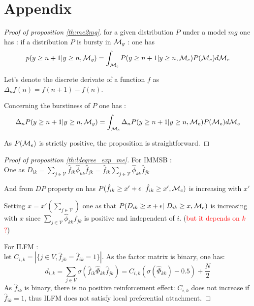 \section{Appendix}

\begin{proof}[Proof of proposition \ref{th:me2mg}]
for a given distribution $P$ under a model $mg$ one has : 
if a distribution $P$ is bursty in $\mathcal{M}_g$ : one has
\begin{equation*}
    p(y \geq n+1 | y \geq n, \mathcal{M}_g) = \int_{\mathcal{M}_e} P(y \geq n+1 | y \geq n, \mathcal{M}_e) P(\mathcal{M}_e) d\mathcal{M}_e
\end{equation*}

Let's denote the discrete derivate of a function $f$  as $\Delta_n f(n) = f(n+1) -f(n)$.

Concerning the burstiness of $P$ one has : 
\begin{equation}
    \Delta_n P(y \geq n+1 | y \geq n, \mathcal{M}_g) = \int_{\mathcal{M}_e}\Delta_n P(y \geq n+1 | y \geq n, \mathcal{M}_e) P(\mathcal{M}_e)d\mathcal{M}_e
\end{equation}

As $P(\mathcal{M}_e)$ is strictly positive, the proposition is straightforward.
\end{proof}



\begin{proof}[Proof of proposition \ref{th:ldegree_exp_me}]
For IMMSB : ~\\

One as 
$D_{ik} = \sum_{j\in\mathcal{V}} \hat f_{ik} \hat \phi_{kk} \hat f_{jk} = \hat f_{ik} \sum_{j\in\mathcal{V}} \hat \phi_{kk} \hat f_{jk}$

And from $DP$ property on has
$P(\hat f_{ik} \geq x' + \epsilon | \hat f_{ik} \geq x', \me)$ is increasing with $x'$

Setting $x = x' (\sum_{j\in\mathcal{V}})$ one as that $P(D_{ik} \geq x + \epsilon | D_{ik}
    \geq x, \me)$ is increasing with $x$ since $\sum_{j\in \mathcal{V}} \hat \phi_{kk}
    \hat f_{jk}$ is positive and independent of $i$. (\textcolor{red}{but it depends on
    $k$ ?})


For ILFM :~\\

 let $C_{i,k} = |\{j \in V, \hat{f}_{jk} = \hat{f}_{ik} = 1\}|$. As the factor matrix is
    binary, one has:
%
\[ 
d_{i,k} = \sum_{j\in V} \sigma(\hat{f}_{ik} \hat{\Phi}_{kk} \hat{f}_{jk}) =  C_{i,k} (\sigma(\hat{\Phi}_{kk})-0.5) + \frac{N}{2}
\]
%
As $\hat{f}_{ik}$ is binary, there is no positive reinforcement effect: $C_{i,k}$ does not
    increase if $\hat{f}_{ik}=1$, thus ILFM does not satisfy local preferential
    attachment.
\end{proof}

